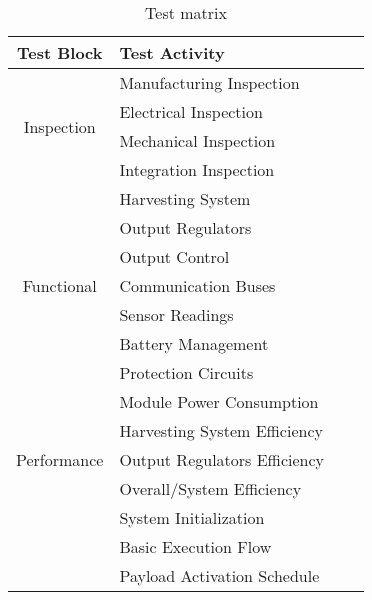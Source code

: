 \begin{table}[htp]
    \small
    \centering
    \begin{tabular}{clll}
        \toprule
        \textbf{Test Block} & \textbf{Test Activity} \\
        \midrule
        \midrule
        \multirow{4}{*}{Inspection}     & Manufacturing Inspection              \\
                                        & Electrical Inspection                 \\
                                        & Mechanical Inspection                 \\
                                        & Integration Inspection                \\
        \midrule
        \multirow{7}{*}{Functional}     & Harvesting System                     \\
                                        & Output Regulators                     \\
                                        & Output Control                        \\
                                        & Communication Buses                   \\
                                        & Sensor Readings                       \\
                                        & Battery Management                    \\
                                        & Protection Circuits                   \\
        \midrule
        \multirow{5}{*}{Performance}    & Module Power Consumption              \\
                                        & Harvesting System Efficiency          \\
                                        & Output Regulators Efficiency          \\
                                        & Overall/System Efficiency             \\
        \midrule
        \multirow{3}{*}{Mission}        & System Initialization                 \\
                                        & Basic Execution Flow                  \\
                                        & Payload Activation Schedule           \\
        \bottomrule
    \end{tabular}
    \caption{Test matrix}
    \label{tab:test-matrix}
\end{table}


